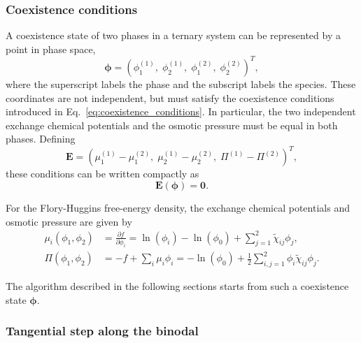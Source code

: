 \documentclass[12pt]{article}
\begin{document}
\subsubsection{Coexistence conditions}

A coexistence state of two phases in a ternary system can be represented by a point in phase space,
\[
\boldsymbol\phi = (\phi_1^{(1)},\; \phi_2^{(1)},\; \phi_1^{(2)},\; \phi_2^{(2)})^T,
\]
where the superscript labels the phase and the subscript labels the species.
These coordinates are not independent, but must satisfy the coexistence conditions introduced in Eq.~\eqref{eq:coexistence_conditions}. In particular, the two independent exchange chemical potentials and the osmotic pressure must be equal in both phases. Defining
\[
\boldsymbol{E}
=
(\mu_1^{(1)}-\mu_1^{(2)},\; \mu_2^{(1)}-\mu_2^{(2)},\; \Pi^{(1)}-\Pi^{(2)})^T,
\]
these conditions can be written compactly as
\[
\boldsymbol{E}(\boldsymbol{\phi}) = \boldsymbol{0}.
\]


For the Flory-Huggins free-energy density, the exchange chemical potentials and osmotic pressure are given by
\[
\begin{aligned}
    \mu_i(\phi_1, \phi_2) &= \frac{\partial f}{\partial \phi_i}
    = \ln(\phi_i) - \ln(\phi_0) + \sum_{j=1}^2 \tilde\chi_{ij}\phi_j,\\
    \Pi(\phi_1, \phi_2) &= -f + \sum_i \mu_i \phi_i
    = -\ln(\phi_0) + \frac{1}{2}\sum_{i,j=1}^2 \phi_i \tilde\chi_{ij} \phi_j.
\end{aligned}
\]

The algorithm described in the following sections starts from such a coexistence state \(\boldsymbol\phi\). 


\subsubsection{Tangential step along the binodal}
\end{document}
